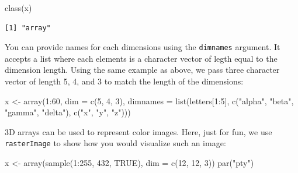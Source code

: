 \documentclass[
]{book}
\newenvironment{Shaded}{\begin{snugshade}}{\end{snugshade}}
\newcommand{\AttributeTok}[1]{\textcolor[rgb]{0.77,0.63,0.00}{#1}}
\newcommand{\ConstantTok}[1]{\textcolor[rgb]{0.00,0.00,0.00}{#1}}
\newcommand{\DecValTok}[1]{\textcolor[rgb]{0.00,0.00,0.81}{#1}}
\newcommand{\FunctionTok}[1]{\textcolor[rgb]{0.00,0.00,0.00}{#1}}
\newcommand{\NormalTok}[1]{#1}
\newcommand{\OtherTok}[1]{\textcolor[rgb]{0.56,0.35,0.01}{#1}}
\newcommand{\SpecialCharTok}[1]{\textcolor[rgb]{0.00,0.00,0.00}{#1}}
\newcommand{\StringTok}[1]{\textcolor[rgb]{0.31,0.60,0.02}{#1}}
\begin{document}
\begin{Shaded}
\begin{Highlighting}[]
\FunctionTok{class}\NormalTok{(x)}
\end{Highlighting}
\end{Shaded}

\begin{verbatim}
[1] "array"
\end{verbatim}

You can provide names for each dimensions using the \texttt{dimnames} argument. It accepts a list where each elements is a character vector of legth equal to the dimension length. Using the same example as above, we pass three character vector of length 5, 4, and 3 to match the length of the dimensions:

\begin{Shaded}
\begin{Highlighting}[]
\NormalTok{x }\OtherTok{\textless{}{-}} \FunctionTok{array}\NormalTok{(}\DecValTok{1}\SpecialCharTok{:}\DecValTok{60}\NormalTok{,}
            \AttributeTok{dim =} \FunctionTok{c}\NormalTok{(}\DecValTok{5}\NormalTok{, }\DecValTok{4}\NormalTok{, }\DecValTok{3}\NormalTok{),}
            \AttributeTok{dimnames =} \FunctionTok{list}\NormalTok{(letters[}\DecValTok{1}\SpecialCharTok{:}\DecValTok{5}\NormalTok{],}
                            \FunctionTok{c}\NormalTok{(}\StringTok{"alpha"}\NormalTok{, }\StringTok{"beta"}\NormalTok{, }\StringTok{"gamma"}\NormalTok{, }\StringTok{"delta"}\NormalTok{),}
                            \FunctionTok{c}\NormalTok{(}\StringTok{"x"}\NormalTok{, }\StringTok{"y"}\NormalTok{, }\StringTok{"z"}\NormalTok{)))}
\end{Highlighting}
\end{Shaded}

3D arrays can be used to represent color images. Here, just for fun, we use \texttt{rasterImage} to show how you would visualize such an image:

\begin{Shaded}
\begin{Highlighting}[]
\NormalTok{x }\OtherTok{\textless{}{-}} \FunctionTok{array}\NormalTok{(}\FunctionTok{sample}\NormalTok{(}\DecValTok{1}\SpecialCharTok{:}\DecValTok{255}\NormalTok{, }\DecValTok{432}\NormalTok{, }\ConstantTok{TRUE}\NormalTok{), }\AttributeTok{dim =} \FunctionTok{c}\NormalTok{(}\DecValTok{12}\NormalTok{, }\DecValTok{12}\NormalTok{, }\DecValTok{3}\NormalTok{))}
\FunctionTok{par}\NormalTok{(}\StringTok{"pty"}\NormalTok{)}
\end{Highlighting}
\end{Shaded}
\end{document}
